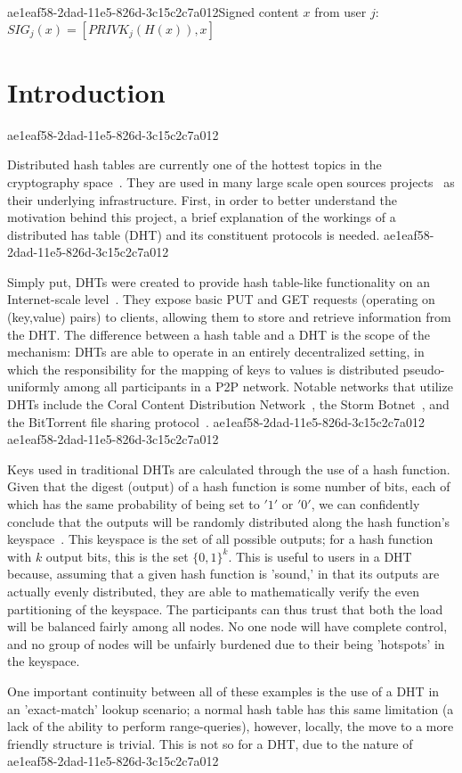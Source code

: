\documentclass[12pt]{article}
\begin{document}
ae1eaf58-2dad-11e5-826d-3c15c2c7a012Signed content $x$ from user $j$: $SIG_j(x) = \left[ PRIVK_j( H(x) ), x \right]$

\section{Introduction}
ae1eaf58-2dad-11e5-826d-3c15c2c7a012\par Distributed hash tables are currently one of the hottest topics in the cryptography space~\cite{Stoica:2001dj,Rowstron:2001ea,Ratnasamy:2001wn}. They are used in many large scale open sources projects~\cite{Freitas:2013tb,Xu:2010vs,Perfitt:2010fh} as their underlying infrastructure. First, in order to better understand the motivation behind this project, a brief explanation of the workings of a distributed has table (DHT) and its constituent protocols is needed.
ae1eaf58-2dad-11e5-826d-3c15c2c7a012
\par Simply put, DHTs were created to provide hash table-like functionality on an Internet-scale level~\cite{Ratnasamy:2001wn}. They expose basic PUT and GET requests (operating on (key,value) pairs) to clients, allowing them to store and retrieve information from the DHT. The difference between a hash table and a DHT is the scope of the mechanism: DHTs are able to operate in an entirely decentralized setting, in which the responsibility for the mapping of keys to values is distributed pseudo-uniformly among all participants in a P2P network. Notable networks that utilize DHTs include the Coral Content Distribution Network~\cite{Freedman:2004vb}, the Storm Botnet~\cite{Holz:2008uk}, and the BitTorrent file sharing protocol~\cite{Cohen:y1_8mBnw}.
ae1eaf58-2dad-11e5-826d-3c15c2c7a012
ae1eaf58-2dad-11e5-826d-3c15c2c7a012\par Keys used in traditional DHTs are calculated through the use of a hash function. Given that the digest (output) of a hash function is some number of bits, each of which has the same probability of being set to $'1'$ or $'0'$, we can confidently conclude that the outputs will be randomly distributed along the hash function's keyspace~. This keyspace is the set of all possible outputs; for a hash function with $k$ output bits, this is the set $\{0,1\}^k$. This is useful to users in a DHT because, assuming that a given hash function is 'sound,' in that its outputs are actually evenly distributed, they are able to mathematically verify the even partitioning of the keyspace. The participants can thus trust that both the load will be balanced fairly among all nodes. No one node will have complete control, and no group of nodes will be unfairly burdened due to their being 'hotspots' in the keyspace.~

\par One important continuity between all of these examples is the use of a DHT in an 'exact-match' lookup scenario; a normal hash table has this same limitation (a lack of the ability to perform range-queries), however, locally, the move to a more friendly structure is trivial. This is not so for a DHT, due to the nature of
\printbibliography
ae1eaf58-2dad-11e5-826d-3c15c2c7a012
\end{document}

